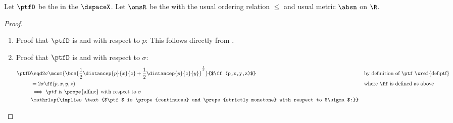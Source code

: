 \begin{corollary}
\label{cor:tri_mono}
Let $\ptfD$ be the   in the   $\dspaceX$.
Let $\omsR$ be the  with the usual ordering relation $\le$ and usual metric $\absn$ on $\R$.
\end{corollary}
\begin{proof}
\begin{enumerate}
  \item Proof that $\ptfD$ is  and  with respect to $p$: This follows directly from .
  \item Proof that $\ptfD$ is  and  with respect to $\sigma$:
    \begin{align*}
      \ptfD
        &\eqd 2\sigma\mcom{\brs{\frac{1}{2}\distancep{p}{x}{z} + \frac{1}{2}\distancep{p}{z}{y}}^\frac{1}{p}}{$\ff(p,x,y,z)$}
        && \text{by definition of $\ptf$ \xref{def:ptf}}
      \\&=  2\sigma\ff(p,x,y,z)
        && \text{where $\ff$ is defined as above}
      \\&\implies\text{$\ptf$ is \prope{affine} with respect to $\sigma$}
      \\&\mathrlap{\implies\text{$\ptf$ is \prope{continuous} and \prope{strictly monotone} with respect to $\sigma$:}}
    \end{align*} 
\end{enumerate}
\end{proof}

